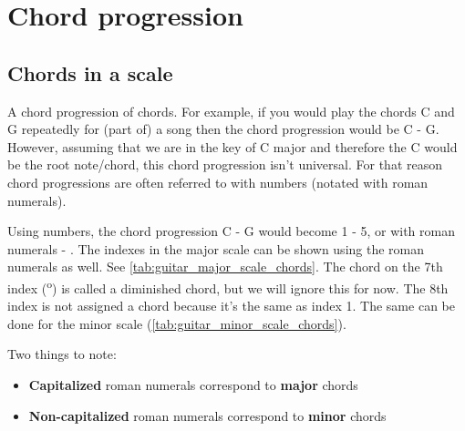 \section{Chord progression}

\subsection{Chords in a scale}

A chord progression of chords. For example, if you would play the chords C and G repeatedly for (part of) a song then the chord progression would be C - G. However, assuming that we are in the key of C major and therefore the C would be the root note/chord, this chord progression isn't universal. For that reason chord progressions are often referred to with numbers (notated with roman numerals).

Using numbers, the chord progression C - G would become 1 - 5, or with roman numerals  - . The indexes in the major scale can be shown using the roman numerals as well. See \autoref{tab:guitar_major_scale_chords}. The chord on the 7th index (\textsuperscript{o}) is called a diminished chord, but we will ignore this for now. The 8th index is not assigned a chord because it's the same as index 1. The same can be done for the minor scale (\autoref{tab:guitar_minor_scale_chords}).

Two things to note:

\begin{itemize}
	\item \textbf{Capitalized} roman numerals correspond to \textbf{major} chords
	\item \textbf{Non-capitalized} roman numerals correspond to \textbf{minor} chords
\end{itemize}


